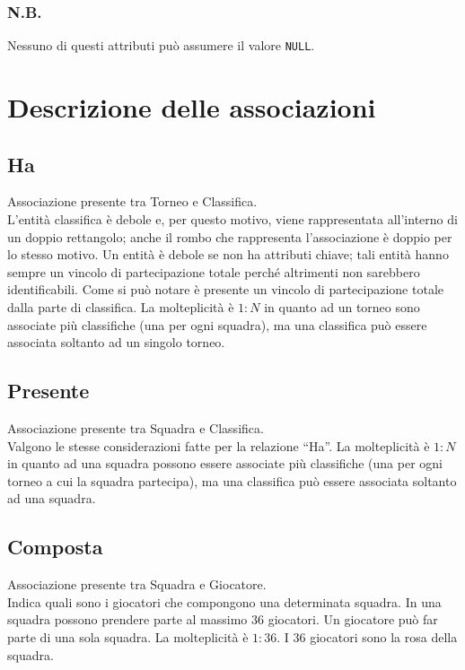 		\subsubsection*{N.B.}
		Nessuno di questi attributi può assumere il valore \texttt{NULL}.

\section{Descrizione delle associazioni}
	
	\subsection{Ha}
	Associazione presente tra Torneo e Classifica. \\
	L’entità classifica è debole e, per questo motivo, viene rappresentata all'interno di un doppio rettangolo; anche il rombo che rappresenta l'associazione è doppio per lo stesso motivo. 
	Un entità è debole se non ha attributi chiave; tali entità hanno sempre un vincolo di partecipazione totale perché altrimenti non sarebbero identificabili. Come si può notare è presente un vincolo di partecipazione totale dalla parte di classifica.
	La molteplicità è $1:N$ in quanto ad un torneo sono associate più classifiche (una per ogni squadra), ma una classifica può essere associata soltanto ad un singolo torneo.
	
	\subsection{Presente}
	Associazione presente tra Squadra e Classifica. \\
	Valgono le stesse considerazioni fatte per la relazione ``Ha''.
	La molteplicità è $1:N$ in quanto ad una squadra possono essere associate più classifiche (una per ogni torneo a cui la squadra partecipa), ma una classifica può essere associata soltanto ad una squadra.
	
	\subsection{Composta}
	Associazione presente tra Squadra e Giocatore. \\
	Indica quali sono i giocatori che compongono una determinata squadra. In una squadra possono prendere parte al massimo $36$ giocatori. Un giocatore può far parte di una sola squadra. La molteplicità è $1: 36$.
	I $36$ giocatori sono la rosa della squadra.
	

